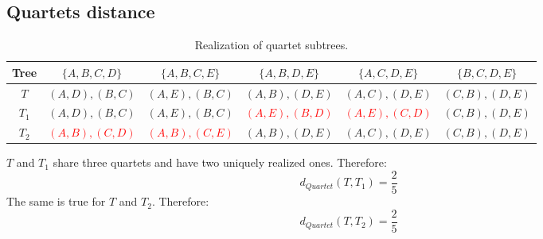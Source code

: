 \subsection{Quartets distance}
\begin{table}[H]
    \centering
    \begin{tabular}{c|ccccc}
        Tree & $\{A,B,C,D\}$ & $\{A,B,C,E\}$ & $\{A,B,D,E\}$ & $\{A,C,D,E\}$ & $\{B,C,D,E\}$     \\ \hline
       $T$  & $(A,D),(B,C)$ & $(A,E),(B,C)$ & $(A,B),(D,E)$ & $(A,C),(D,E)$ & $(C,B),(D,E)$ \\
       $T_1$  & $(A,D),(B,C)$ & $(A,E),(B,C)$ &\textcolor{red}{ $(A,E),(B,D)$} & \textcolor{red}{$(A,E),(C,D)$} & $(C,B),(D,E)$ \\
       $T_2$  & \textcolor{red}{$(A,B),(C,D)$} & \textcolor{red}{$(A,B),(C,E)$} & $(A,B),(D,E)$ & $(A,C),(D,E)$ & $(C,B),(D,E)$ 
    \end{tabular}
    \caption{Realization of quartet subtrees.}
    \label{tab:my_label}
\end{table}
$T$ and $T_1$ share three quartets and have two uniquely realized ones. Therefore: 
\[
d_{Quartet} (T, T_1 ) = \frac{2}{5}
\]
The same is true for $T$ and $T_2$. Therefore:
\[
d_{Quartet} (T, T_2 ) = \frac{2}{5}
\]
